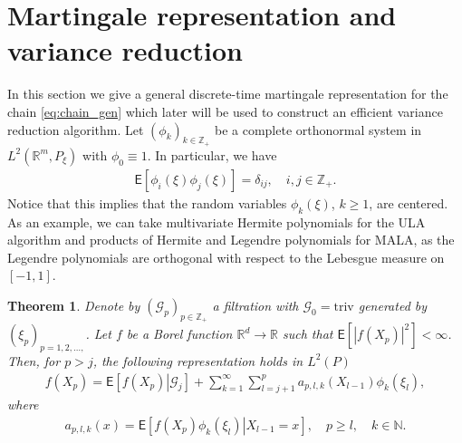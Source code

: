 \documentclass[article]{elsarticle}
\newtheorem{thm}{Theorem}
\begin{document}
\section{Martingale representation and variance reduction}
\label{seq:mart_repr}
In this section we give a general discrete-time martingale representation for the chain \eqref{eq:chain_gen} which later will be used to construct an efficient variance reduction algorithm. Let \((\phi_k)_{k\in \mathbb{Z}_+}\) be a complete orthonormal system in \(L^2(\mathbb{R}^m, P_{\xi})\) with \(\phi_0\equiv 1\). In particular, we have
\begin{eqnarray*}
\mathsf{E}[\phi_i(\xi)\phi_j(\xi)]=\delta_{ij},\quad i,j\in  \mathbb{Z}_{+}.
\end{eqnarray*}
Notice that this implies that the random variables
$\phi_k(\xi)$, $k\ge1$, are centered. As an example, we can take  multivariate Hermite polynomials for the ULA algorithm and products of Hermite and Legendre polynomials for MALA, as the Legendre polynomials are orthogonal with respect to the Lebesgue measure on \([-1,1].\)
\begin{thm}\label{prop:29032018a1}
Denote by $(\mathcal{G}_p)_{p\in \mathbb{Z}_+}$  a filtration
with $\mathcal{G}_0=\mathrm{triv}$
generated by $(\xi_p)_{p=1,2,\ldots,}$. Let $f$ be a Borel function $\mathbb{R}^{d}\to\mathbb R$ such that
$\mathsf{E}\left[\left|f(X_{p})\right|^{2}\right]<\infty$. Then,
for $p>j$, the following representation holds in \(L^2(P)\)
\begin{eqnarray}
\label{eq:mart_repr}
f(X_{p})=\mathsf{E}\left[\left.f(X_{p})\right|\mathcal G_{j}\right]+\sum_{k=1}^{\infty}\sum_{l=j+1}^{p}a_{p,l,k}(X_{l-1})\phi_k\left(\xi_{l}\right),
\end{eqnarray}
where
\begin{eqnarray}
\label{eq:coeff_mart}
a_{p,l,k}(x)=\mathsf{E}\left[\left.f(X_{p})\phi_k\left(\xi_{l}\right)\right|X_{l-1}=x\right], \quad p\geq l, \quad k\in \mathbb{N}.
\end{eqnarray}
\end{thm}
\end{document}
